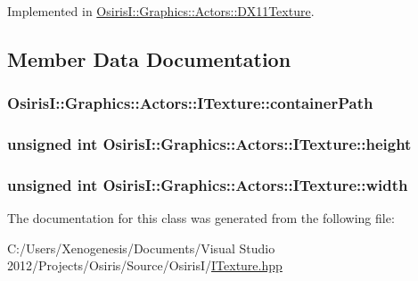 Implemented in \hyperlink{class_osiris_i_1_1_graphics_1_1_actors_1_1_d_x11_texture_a4c7bb942c4c93190febf992a87c480f8}{Osiris\-I\-::\-Graphics\-::\-Actors\-::\-D\-X11\-Texture}.



\subsection{Member Data Documentation}
\hypertarget{class_osiris_i_1_1_graphics_1_1_actors_1_1_i_texture_a477657c9ca16ece4465a2833ae14ce14}{
\subsubsection[{container\-Path}]{ Osiris\-I\-::\-Graphics\-::\-Actors\-::\-I\-Texture\-::container\-Path\hspace{0.3cm}{\ttfamily [protected]}}}\label{class_osiris_i_1_1_graphics_1_1_actors_1_1_i_texture_a477657c9ca16ece4465a2833ae14ce14}
\hypertarget{class_osiris_i_1_1_graphics_1_1_actors_1_1_i_texture_a82537ccd8499c03add6f073048f50104}{
\subsubsection[{height}]{\setlength{\rightskip}{0pt plus 5cm}unsigned int Osiris\-I\-::\-Graphics\-::\-Actors\-::\-I\-Texture\-::height\hspace{0.3cm}{\ttfamily [protected]}}}\label{class_osiris_i_1_1_graphics_1_1_actors_1_1_i_texture_a82537ccd8499c03add6f073048f50104}
\hypertarget{class_osiris_i_1_1_graphics_1_1_actors_1_1_i_texture_a92baa55e7bac29480756a9e63eda3679}{
\subsubsection[{width}]{\setlength{\rightskip}{0pt plus 5cm}unsigned int Osiris\-I\-::\-Graphics\-::\-Actors\-::\-I\-Texture\-::width\hspace{0.3cm}{\ttfamily [protected]}}}\label{class_osiris_i_1_1_graphics_1_1_actors_1_1_i_texture_a92baa55e7bac29480756a9e63eda3679}


The documentation for this class was generated from the following file\-:\begin{DoxyCompactItemize}
\item 
C\-:/\-Users/\-Xenogenesis/\-Documents/\-Visual Studio 2012/\-Projects/\-Osiris/\-Source/\-Osiris\-I/\hyperlink{_i_texture_8hpp}{I\-Texture.\-hpp}\end{DoxyCompactItemize}
